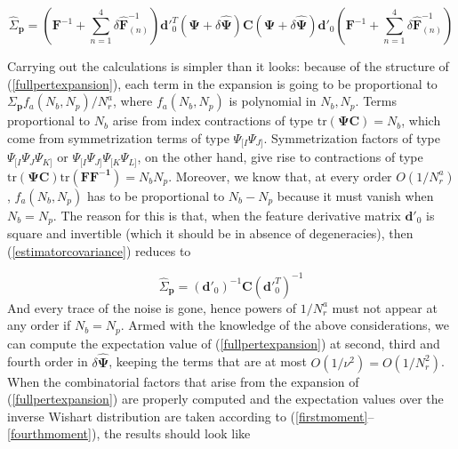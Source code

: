 \documentclass[reprint,aps,prd,superscriptaddress,showkeys,showpacs]{revtex4-1}
\newcommand{\bb}[1]{\mathbf{#1}}
\newcommand{\bbh}[1]{\mathbf{\hat{#1}}}
\newcommand{\h}[1]{\hat{#1}}
\begin{document}
\begin{widetext}
\begin{equation}
\label{fullpertexpansion}
\h{\Sigma}_\bb{p} = \left(\bb{F}^{-1}+\sum_{n=1}^4\delta\bbh{F}^{-1}_{(n)}\right)\bb{d}'^T_0(\bb{\Psi}+\delta\bbh{\Psi})\bb{C}(\bb{\Psi}+\delta\bbh{\Psi})\bb{d}'_0\left(\bb{F}^{-1}+\sum_{n=1}^4\delta\bbh{F}^{-1}_{(n)}\right)
\end{equation}
\end{widetext}
%
Carrying out the calculations is simpler than it looks: because of the structure of (\ref{fullpertexpansion}), each term in the expansion is going to be proportional to $\Sigma_\bb{p}f_a(N_b,N_p)/N_r^a$, where $f_a(N_b,N_p)$ is polynomial in $N_b,N_p$. Terms proportional to $N_b$ arise from index contractions of type $\mathrm{tr}(\bb{\Psi C})=N_b$, which come from symmetrization terms of type $\Psi_{[I}\Psi_{J]}$. Symmetrization factors of type $\Psi_{[I}\Psi_J\Psi_{K]}$ or $\Psi_{[I}\Psi_{J]}\Psi_{[K}\Psi_{L]}$, on the other hand, give rise to contractions of type $\mathrm{tr}(\bb{\Psi C})\mathrm{tr}(\bb{\bb{F}\bb{F}^{-1}})=N_bN_p$. Moreover, we know that, at every order $O(1/N_r^a)$, $f_a(N_b,N_p)$ has to be proportional to $N_b-N_p$ because it must vanish when $N_b=N_p$. The reason for this is that, when the feature derivative matrix $\bb{d}'_0$ is square and invertible (which it should be in absence of degeneracies), then (\ref{estimatorcovariance}) reduces to 

\begin{equation}
\h{\Sigma}_\bb{p} = (\bb{d}'_0)^{-1}\bb{C}(\bb{d}'^T_0)^{-1}
\end{equation} 
%
And every trace of the noise is gone, hence powers of $1/N_r^a$ must not appear at any order if $N_b=N_p$. Armed with the knowledge of the above considerations, we can compute the expectation value of (\ref{fullpertexpansion}) at second, third and fourth order in $\delta\bbh{\Psi}$, keeping the terms that are at most $O(1/\nu^2)=O(1/N_r^2)$. When the combinatorial factors that arise from the expansion of (\ref{fullpertexpansion}) are properly computed and the expectation values over the inverse Wishart distribution are taken according to (\ref{firstmoment}--\ref{fourthmoment}), the results should look like
\end{document}
